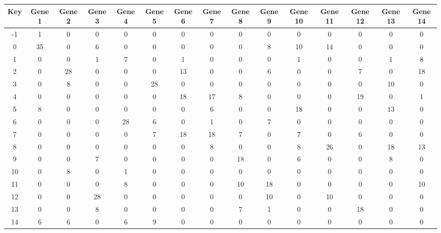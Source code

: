\begin{tabular}{|c|c|c|c|c|c|c|c|c|c|c|c|c|c|c|}
\hline
Key & Gene 1 & Gene 2 & Gene 3 & Gene 4 & Gene 5 & Gene 6 & Gene 7 & Gene 8 & Gene 9 & Gene 10 & Gene 11 & Gene 12 & Gene 13 & Gene 14 \\
\hline
-1 & 1 & 0 & 0 & 0 & 0 & 0 & 0 & 0 & 0 & 0 & 0 & 0 & 0 & 0 \\
0 & 35 & 0 & 6 & 0 & 0 & 0 & 0 & 0 & 8 & 10 & 14 & 0 & 0 & 0 \\
1 & 0 & 0 & 1 & 7 & 0 & 1 & 0 & 0 & 0 & 1 & 0 & 0 & 1 & 8 \\
2 & 0 & 28 & 0 & 0 & 0 & 13 & 0 & 0 & 6 & 0 & 0 & 7 & 0 & 18 \\
3 & 0 & 8 & 0 & 0 & 28 & 0 & 0 & 0 & 0 & 0 & 0 & 0 & 10 & 0 \\
4 & 0 & 0 & 0 & 0 & 0 & 18 & 17 & 8 & 0 & 0 & 0 & 19 & 0 & 1 \\
5 & 8 & 0 & 0 & 0 & 0 & 0 & 6 & 0 & 0 & 18 & 0 & 0 & 13 & 0 \\
6 & 0 & 0 & 0 & 28 & 6 & 0 & 1 & 0 & 7 & 0 & 0 & 0 & 0 & 0 \\
7 & 0 & 0 & 0 & 0 & 7 & 18 & 18 & 7 & 0 & 7 & 0 & 6 & 0 & 0 \\
8 & 0 & 0 & 0 & 0 & 0 & 0 & 8 & 0 & 0 & 8 & 26 & 0 & 18 & 13 \\
9 & 0 & 0 & 7 & 0 & 0 & 0 & 0 & 18 & 0 & 6 & 0 & 0 & 8 & 0 \\
10 & 0 & 8 & 0 & 1 & 0 & 0 & 0 & 0 & 0 & 0 & 0 & 0 & 0 & 0 \\
11 & 0 & 0 & 0 & 8 & 0 & 0 & 0 & 10 & 18 & 0 & 0 & 0 & 0 & 10 \\
12 & 0 & 0 & 28 & 0 & 0 & 0 & 0 & 0 & 10 & 0 & 10 & 0 & 0 & 0 \\
13 & 0 & 0 & 8 & 0 & 0 & 0 & 0 & 7 & 1 & 0 & 0 & 18 & 0 & 0 \\
14 & 6 & 6 & 0 & 6 & 9 & 0 & 0 & 0 & 0 & 0 & 0 & 0 & 0 & 0 \\
\hline
\end{tabular}